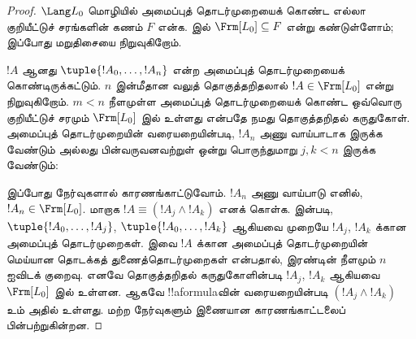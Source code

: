 \documentclass[../../../include/open-logic-section]{subfiles}
\begin{document}
\begin{proof}
$\Lang L_0$ மொழியில் அமைப்புத் தொடர்முறையைக் கொண்ட எல்லா குறியீட்டுச்
சரங்களின் கணம் $F$ என்க.  இல்
$\Frm[L_0] \subseteq F$ என்று கண்டுள்ளோம்; இப்போது மறுதிசையை நிறுவுகிறோம்.

$!A$ ஆனது $\tuple{!A_0,\dotsc,!A_n}$ என்ற அமைப்புத் தொடர்முறையைக்
கொண்டிருக்கட்டும். $n$ இன்மீதான வலுத் தொகுத்தறிதலால்
$!A \in \Frm[L_0]$ என்று நிறுவுகிறோம். $m < n$ நீளமுள்ள அமைப்புத்
தொடர்முறையைக் கொண்ட ஒவ்வொரு குறியீட்டுச் சரமும் $\Frm[L_0]$ இல் உள்ளது
என்பதே நமது தொகுத்தறிதல் கருதுகோள். அமைப்புத் தொடர்முறையின்
வரையறையின்படி, $!A_n$ அணு வாய்பாடாக இருக்க வேண்டும் அல்லது
பின்வருவனவற்றுள் ஒன்று பொருந்துமாறு $j,k < n$ இருக்க வேண்டும்:
\begin{enumerate}
\end{enumerate}

இப்போது நேர்வுகளால் காரணங்காட்டுவோம். $!A_n$ அணு வாய்பாடு எனில்,
$!A_n \in \Frm[L_0]$. மாறாக $!A \equiv (!A_j \land !A_k)$ எனக்
கொள்க.  இன்படி,
$\tuple{!A_0,\dotsc,!A_j}$, $\tuple{!A_0,\dotsc,!A_k}$ ஆகியவை முறையே
$!A_j$, $!A_k$ க்கான அமைப்புத் தொடர்முறைகள். இவை $!A$ க்கான அமைப்புத்
தொடர்முறையின் மெய்யான தொடக்கத் துணைத்தொடர்முறைகள் என்பதால், இரண்டின்
நீளமும் $n$ ஐவிடக் குறைவு. எனவே தொகுத்தறிதல் கருதுகோளின்படி $!A_j$,
$!A_k$ ஆகியவை $\Frm[L_0]$ இல் உள்ளன. ஆகவே !!a{formula}வின்
வரையறையின்படி $(!A_j \land !A_k)$ உம் அதில் உள்ளது. மற்ற நேர்வுகளும்
இணையான காரணங்காட்டலைப் பின்பற்றுகின்றன.
\end{proof}
\end{document}
